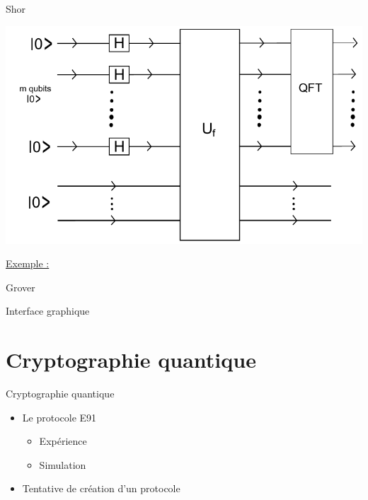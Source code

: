 \documentclass[french]{beamer}
\begin{document}
\begin{frame}{Shor}
    \begin{center}
        \includegraphics[scale=0.25]{Fabrice.png}
    \end{center}
    \underline{Exemple :} %
\end{frame}


\begin{frame}{Grover}
\end{frame}

\begin{frame}{Interface graphique}
\end{frame}

\section{Cryptographie quantique}

\begin{frame}{Cryptographie quantique}
\begin{itemize}
    \item<1-> Le protocole E91
    \begin{itemize}
        \item Expérience
        \item Simulation
    \end{itemize}
    \item<2-> Tentative de création d'un protocole
\end{itemize}
\end{frame}
\end{document}
